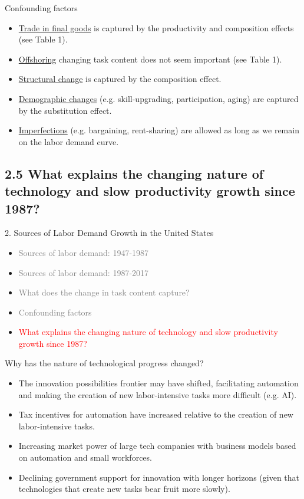 \documentclass[notes=show]{beamer}
\begin{document}
\begin{frame}{Confounding factors}
\begin{itemize}
\item \underline{Trade in final goods} is captured by the productivity and composition effects (see Table 1). \medskip
\item \underline{Offshoring} changing task content does not seem important (see Table 1). \medskip
\item \underline{Structural change} is captured by the composition effect.  \medskip
\item \underline{Demographic changes} (e.g. skill-upgrading, participation, aging) are captured by the substitution effect. \medskip
\item \underline{Imperfections} (e.g. bargaining, rent-sharing) are allowed as long as we remain on the labor demand curve.
\end{itemize}
\end{frame}

\subsection{2.5 What explains the changing nature of technology and slow productivity growth since 1987?}

\begin{frame}{2. Sources of Labor Demand Growth in the United States}
\begin{itemize}
\item[\textcolor{gray}{2.1}] \textcolor{gray}{Sources of labor demand: 1947-1987} \medskip
\item[\textcolor{gray}{2.2}] \textcolor{gray}{Sources of labor demand: 1987-2017} \medskip
\item[\textcolor{gray}{2.3}] \textcolor{gray}{What does the change in task content capture?} \medskip
\item[\textcolor{gray}{2.4}] \textcolor{gray}{Confounding factors} \medskip
\item[\textcolor{red}{2.5}] \textcolor{red}{What explains the changing nature of technology and slow productivity growth since 1987?} 
\end{itemize}
\end{frame}

\begin{frame}{Why has the nature of technological progress changed?}
\begin{itemize}
\item The innovation possibilities frontier may have shifted, facilitating automation and making the creation of new labor-intensive tasks more difficult (e.g. AI). \medskip
\item Tax incentives for automation have increased relative to the creation of new labor-intensive tasks. \medskip
\item Increasing market power of large tech companies with business models based on automation and small workforces. \medskip
\item Declining government support for innovation with longer horizons (given that technologies that create new tasks bear fruit more slowly).
\end{itemize}
\end{frame}
\end{document}

